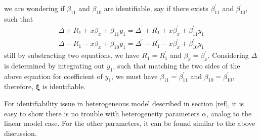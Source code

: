 \documentclass[12pt]{article}
\begin{document}
we are wondering if $\beta_{11}$ and $\beta_{10}$ are identifiable,
say if there exists $\beta_{11}^{'}$ and $\beta_{10}^{'}$, such that
\begin{align*}
  \Delta + R_1 + x\beta_x + \beta_{11}y_1 = \Delta^{'} + R_1^{'} + x\beta_{x}^{'} + \beta_{11}^{'}y_1\\
  \Delta - R_1 - x\beta_x + \beta_{10}y_1 = \Delta^{'} - R_1^{'} -
  x\beta_{x}^{'} + \beta_{10}^{'}y_1
\end{align*}
still by substracting two equations, we have $R_1 = R_1^{'}$ and
$\beta_x = \beta_x^{'}$. Considering $\Delta$ is determined by
integrating out $y_1$, such that matching the two sides of the above
equation for coefficient of $y_1$, we must have $\beta_{11} =
\beta_{11}^{'}$ and $\beta_{10} = \beta_{10}^{'}$, therefore, $\bm
\xi$ is identifiable.

For identifiability issue in heterogeneous model described in section
[ref], it is easy to show there is no trouble with heterogeneity
parameters $\alpha$, analog to the linear model case. For the other
parameters, it can be found similar to the above discussion.
\end{document}
